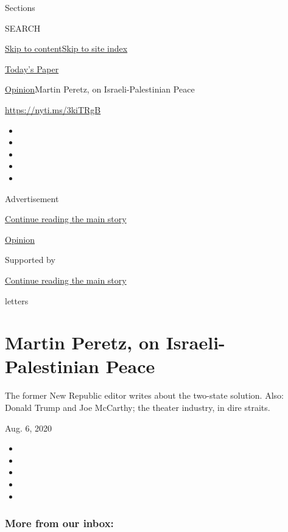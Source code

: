 Sections

SEARCH

\protect\hyperlink{site-content}{Skip to
content}\protect\hyperlink{site-index}{Skip to site index}

\href{https://myaccount.nytimes.com/auth/login?response_type=cookie\&client_id=vi}{}

\href{https://www.nytimes.com/section/todayspaper}{Today's Paper}

\href{/section/opinion}{Opinion}\textbar{}Martin Peretz, on
Israeli-Palestinian Peace

\href{https://nyti.ms/3kiTRgB}{https://nyti.ms/3kiTRgB}

\begin{itemize}
\item
\item
\item
\item
\item
\end{itemize}

Advertisement

\protect\hyperlink{after-top}{Continue reading the main story}

\href{/section/opinion}{Opinion}

Supported by

\protect\hyperlink{after-sponsor}{Continue reading the main story}

letters

\hypertarget{martin-peretz-on-israeli-palestinian-peace}{%
\section{Martin Peretz, on Israeli-Palestinian
Peace}\label{martin-peretz-on-israeli-palestinian-peace}}

The former New Republic editor writes about the two-state solution.
Also: Donald Trump and Joe McCarthy; the theater industry, in dire
straits.

Aug. 6, 2020

\begin{itemize}
\item
\item
\item
\item
\item
\end{itemize}

\hypertarget{more-from-our-inbox}{%
\subsubsection{More from our inbox:}\label{more-from-our-inbox}}

